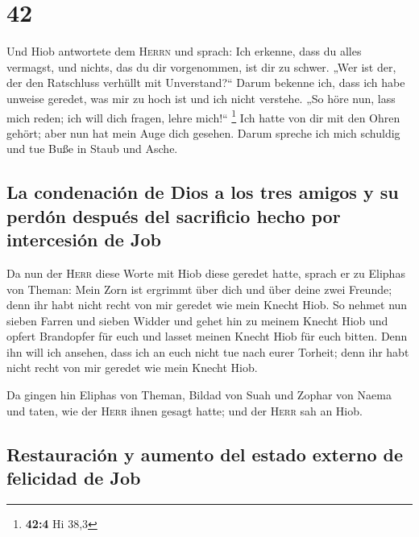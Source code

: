 \hypertarget{section-41}{%
\section{42}\label{section-41}}

 Und Hiob antwortete dem \textsc{Herrn} und sprach:
 Ich erkenne, dass du alles vermagst, und nichts, das du
dir vorgenommen, ist dir zu schwer.  „Wer ist der, der den
Ratschluss verhüllt mit Unverstand?{}`` Darum bekenne ich, dass ich habe
unweise geredet, was mir zu hoch ist und ich nicht verstehe.
 „So höre nun, lass mich reden; ich will dich fragen,
lehre mich!{}`` \footnote{\textbf{42:4} Hi 38,3}  Ich
hatte von dir mit den Ohren gehört; aber nun hat mein Auge dich gesehen.
 Darum spreche ich mich schuldig und tue Buße in Staub und
Asche.

\hypertarget{la-condenaciuxf3n-de-dios-a-los-tres-amigos-y-su-perduxf3n-despuuxe9s-del-sacrificio-hecho-por-intercesiuxf3n-de-job}{%
\subsection{La condenación de Dios a los tres amigos y su perdón después
del sacrificio hecho por intercesión de
Job}\label{la-condenaciuxf3n-de-dios-a-los-tres-amigos-y-su-perduxf3n-despuuxe9s-del-sacrificio-hecho-por-intercesiuxf3n-de-job}}

 Da nun der \textsc{Herr} diese Worte mit Hiob diese
geredet hatte, sprach er zu Eliphas von Theman: Mein Zorn ist ergrimmt
über dich und über deine zwei Freunde; denn ihr habt nicht recht von mir
geredet wie mein Knecht Hiob.  So nehmet nun sieben Farren
und sieben Widder und gehet hin zu meinem Knecht Hiob und opfert
Brandopfer für euch und lasset meinen Knecht Hiob für euch bitten. Denn
ihn will ich ansehen, dass ich an euch nicht tue nach eurer Torheit;
denn ihr habt nicht recht von mir geredet wie mein Knecht Hiob.

 Da gingen hin Eliphas von Theman, Bildad von Suah und
Zophar von Naema und taten, wie der \textsc{Herr} ihnen gesagt hatte;
und der \textsc{Herr} sah an Hiob.

\hypertarget{restauraciuxf3n-y-aumento-del-estado-externo-de-felicidad-de-job}{%
\subsection{Restauración y aumento del estado externo de felicidad de
Job}\label{restauraciuxf3n-y-aumento-del-estado-externo-de-felicidad-de-job}}

